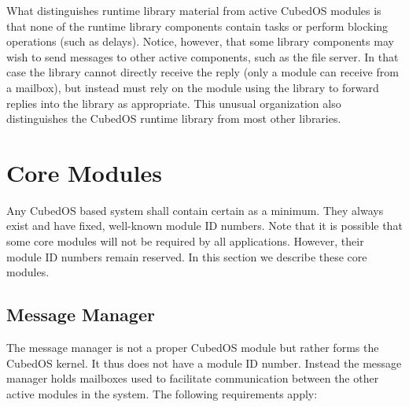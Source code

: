 What distinguishes runtime library material from active CubedOS modules is that none of the
runtime library components contain tasks or perform blocking operations (such as delays).
Notice, however, that some library components may wish to send messages to other active
components, such as the file server. In that case the library cannot directly receive the reply
(only a module can receive from a mailbox), but instead must rely on the module using the
library to forward replies into the library as appropriate. This unusual organization also
distinguishes the CubedOS runtime library from most other libraries.

\section{Core Modules}
\label{sec:core-modules}

Any CubedOS based system shall contain certain  as a minimum. They always
exist and have fixed, well-known module ID numbers. Note that it is possible that some core
modules will not be required by all applications. However, their module ID numbers remain
reserved. In this section we describe these core modules.

\subsection{Message Manager}
\label{sec:message-manager}

The message manager is not a proper CubedOS module but rather forms the CubedOS kernel. It thus
does not have a module ID number. Instead the message manager holds mailboxes used to facilitate
communication between the other active modules in the system. The following requirements apply:


